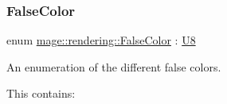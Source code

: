 \mbox{\label{namespacemage_1_1rendering_a6c3d1f4e7a5ae72dc07226e971205534}} 
\subsubsection{\texorpdfstring{False\+Color}{FalseColor}}
{\footnotesize\ttfamily enum \mbox{\hyperlink{namespacemage_1_1rendering_a6c3d1f4e7a5ae72dc07226e971205534}{mage\+::rendering\+::\+False\+Color}} \+: \mbox{\hyperlink{namespacemage_a30677c03d683c4c35630c25f6ff3fb7f}{U8}}\hspace{0.3cm}{\ttfamily [strong]}}

An enumeration of the different false colors.

This contains\+:

